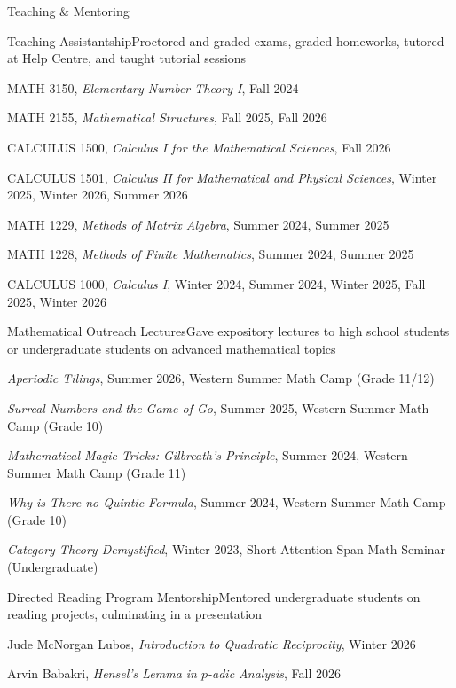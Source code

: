 \documentclass{resume}
\begin{document}
\begin{rSection}{Teaching \& Mentoring} \itemsep -3pt
    \begin{rSubsection}{Teaching Assistantship}{}{Proctored and graded exams, graded homeworks, tutored at Help Centre, and taught tutorial sessions}{}
        \item MATH 3150, \textit{Elementary Number Theory I}, Fall 2024
        \item MATH 2155, \textit{Mathematical Structures}, Fall 2025, Fall 2026
        \item CALCULUS 1500, \textit{Calculus I for the Mathematical Sciences}, Fall 2026
        \item CALCULUS 1501, \textit{Calculus II for Mathematical and Physical Sciences}, Winter 2025, Winter 2026, Summer 2026
        \item MATH 1229, \textit{Methods of Matrix Algebra}, Summer 2024, Summer 2025
        \item MATH 1228, \textit{Methods of Finite Mathematics}, Summer 2024, Summer 2025
        \item CALCULUS 1000, \textit{Calculus I}, Winter 2024, Summer 2024, Winter 2025, Fall 2025, Winter 2026
    \end{rSubsection}
    \begin{rSubsection}{Mathematical Outreach Lectures}{}{Gave expository lectures to high school students or undergraduate students on advanced mathematical topics}{}
        \item {\em Aperiodic Tilings}, Summer 2026, Western Summer Math Camp (Grade 11/12)
        \item {\em Surreal Numbers and the Game of Go}, Summer 2025, Western Summer Math Camp (Grade 10)
        \item {\em Mathematical Magic Tricks: Gilbreath's Principle}, Summer 2024, Western Summer Math Camp (Grade 11)
        \item {\em Why is There no Quintic Formula}, Summer 2024, Western Summer Math Camp (Grade 10)
        \item {\em Category Theory Demystified}, Winter 2023, Short Attention Span Math Seminar (Undergraduate)
\end{rSubsection}
    \begin{rSubsection}{Directed Reading Program Mentorship}{}{Mentored undergraduate students on reading projects, culminating in a presentation}{}
        \item Jude McNorgan Lubos, \textit{Introduction to Quadratic Reciprocity}, Winter 2026
        \item Arvin Babakri, \textit{Hensel's Lemma in $p$-adic Analysis}, Fall 2026
    \end{rSubsection}
\end{rSection}
\vspace{0.25em}
\end{document}
